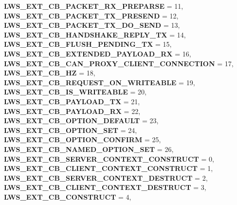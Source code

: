 \begin{DoxyCompactItemize}
\newline
{\bfseries L\+W\+S\+\_\+\+E\+X\+T\+\_\+\+C\+B\+\_\+\+P\+A\+C\+K\+E\+T\+\_\+\+R\+X\+\_\+\+P\+R\+E\+P\+A\+R\+SE} = 11, 
{\bfseries L\+W\+S\+\_\+\+E\+X\+T\+\_\+\+C\+B\+\_\+\+P\+A\+C\+K\+E\+T\+\_\+\+T\+X\+\_\+\+P\+R\+E\+S\+E\+ND} = 12, 
{\bfseries L\+W\+S\+\_\+\+E\+X\+T\+\_\+\+C\+B\+\_\+\+P\+A\+C\+K\+E\+T\+\_\+\+T\+X\+\_\+\+D\+O\+\_\+\+S\+E\+ND} = 13, 
{\bfseries L\+W\+S\+\_\+\+E\+X\+T\+\_\+\+C\+B\+\_\+\+H\+A\+N\+D\+S\+H\+A\+K\+E\+\_\+\+R\+E\+P\+L\+Y\+\_\+\+TX} = 14, 
\newline
{\bfseries L\+W\+S\+\_\+\+E\+X\+T\+\_\+\+C\+B\+\_\+\+F\+L\+U\+S\+H\+\_\+\+P\+E\+N\+D\+I\+N\+G\+\_\+\+TX} = 15, 
{\bfseries L\+W\+S\+\_\+\+E\+X\+T\+\_\+\+C\+B\+\_\+\+E\+X\+T\+E\+N\+D\+E\+D\+\_\+\+P\+A\+Y\+L\+O\+A\+D\+\_\+\+RX} = 16, 
{\bfseries L\+W\+S\+\_\+\+E\+X\+T\+\_\+\+C\+B\+\_\+\+C\+A\+N\+\_\+\+P\+R\+O\+X\+Y\+\_\+\+C\+L\+I\+E\+N\+T\+\_\+\+C\+O\+N\+N\+E\+C\+T\+I\+ON} = 17, 
{\bfseries L\+W\+S\+\_\+\+E\+X\+T\+\_\+\+C\+B\+\_\+HZ} = 18, 
\newline
{\bfseries L\+W\+S\+\_\+\+E\+X\+T\+\_\+\+C\+B\+\_\+\+R\+E\+Q\+U\+E\+S\+T\+\_\+\+O\+N\+\_\+\+W\+R\+I\+T\+E\+A\+B\+LE} = 19, 
{\bfseries L\+W\+S\+\_\+\+E\+X\+T\+\_\+\+C\+B\+\_\+\+I\+S\+\_\+\+W\+R\+I\+T\+E\+A\+B\+LE} = 20, 
{\bfseries L\+W\+S\+\_\+\+E\+X\+T\+\_\+\+C\+B\+\_\+\+P\+A\+Y\+L\+O\+A\+D\+\_\+\+TX} = 21, 
{\bfseries L\+W\+S\+\_\+\+E\+X\+T\+\_\+\+C\+B\+\_\+\+P\+A\+Y\+L\+O\+A\+D\+\_\+\+RX} = 22, 
\newline
{\bfseries L\+W\+S\+\_\+\+E\+X\+T\+\_\+\+C\+B\+\_\+\+O\+P\+T\+I\+O\+N\+\_\+\+D\+E\+F\+A\+U\+LT} = 23, 
{\bfseries L\+W\+S\+\_\+\+E\+X\+T\+\_\+\+C\+B\+\_\+\+O\+P\+T\+I\+O\+N\+\_\+\+S\+ET} = 24, 
{\bfseries L\+W\+S\+\_\+\+E\+X\+T\+\_\+\+C\+B\+\_\+\+O\+P\+T\+I\+O\+N\+\_\+\+C\+O\+N\+F\+I\+RM} = 25, 
{\bfseries L\+W\+S\+\_\+\+E\+X\+T\+\_\+\+C\+B\+\_\+\+N\+A\+M\+E\+D\+\_\+\+O\+P\+T\+I\+O\+N\+\_\+\+S\+ET} = 26, 
\newline
{\bfseries L\+W\+S\+\_\+\+E\+X\+T\+\_\+\+C\+B\+\_\+\+S\+E\+R\+V\+E\+R\+\_\+\+C\+O\+N\+T\+E\+X\+T\+\_\+\+C\+O\+N\+S\+T\+R\+U\+CT} = 0, 
{\bfseries L\+W\+S\+\_\+\+E\+X\+T\+\_\+\+C\+B\+\_\+\+C\+L\+I\+E\+N\+T\+\_\+\+C\+O\+N\+T\+E\+X\+T\+\_\+\+C\+O\+N\+S\+T\+R\+U\+CT} = 1, 
{\bfseries L\+W\+S\+\_\+\+E\+X\+T\+\_\+\+C\+B\+\_\+\+S\+E\+R\+V\+E\+R\+\_\+\+C\+O\+N\+T\+E\+X\+T\+\_\+\+D\+E\+S\+T\+R\+U\+CT} = 2, 
{\bfseries L\+W\+S\+\_\+\+E\+X\+T\+\_\+\+C\+B\+\_\+\+C\+L\+I\+E\+N\+T\+\_\+\+C\+O\+N\+T\+E\+X\+T\+\_\+\+D\+E\+S\+T\+R\+U\+CT} = 3, 
\newline
{\bfseries L\+W\+S\+\_\+\+E\+X\+T\+\_\+\+C\+B\+\_\+\+C\+O\+N\+S\+T\+R\+U\+CT} = 4, 

\end{DoxyCompactItemize}
